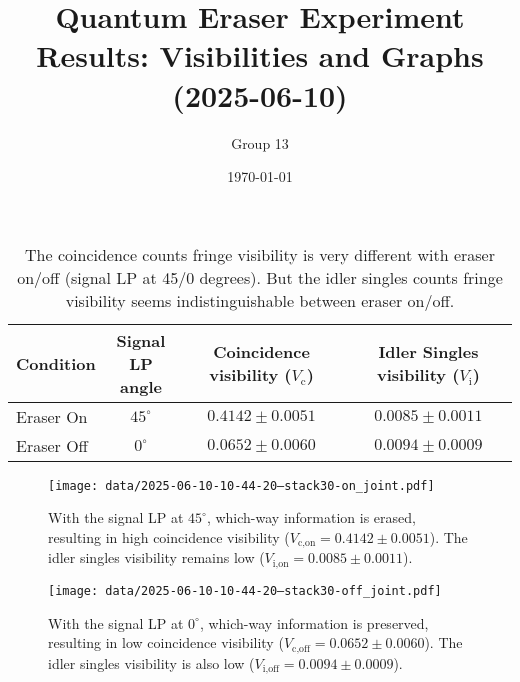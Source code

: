\documentclass{article}
\title{Quantum Eraser Experiment Results: Visibilities and Graphs (2025-06-10)}
\author{Group 13} %
\date{\today}
\begin{document}
\pagestyle{empty} %

\begin{table}[h!]
\centering
\begin{tabular}{lccc}
\toprule
Condition & \makecell{Signal \\ LP angle} & \makecell{Coincidence \\ visibility ($V_{\text{c}}$)} & \makecell{Idler Singles \\ visibility ($V_{\text{i}}$)} \\
\midrule
Eraser On   & $45^\circ$ & $0.4142 \pm 0.0051$ & $0.0085 \pm 0.0011$ \\
Eraser Off  & $0^\circ$  & $0.0652 \pm 0.0060$ & $0.0094 \pm 0.0009$ \\
\bottomrule
\end{tabular}
\caption*{
  The coincidence counts fringe visibility is very different with eraser on/off (signal LP at 45/0 degrees).
  But the idler singles counts fringe visibility seems indistinguishable between eraser on/off.
}
\end{table}

\begin{figure}[h!]
\centering
\texttt{[image: data/2025-06-10-10-44-20--stack30-on\_joint.pdf]}
\caption*{
  With the signal LP at $45^\circ$, which-way information is erased, resulting in high coincidence visibility ($V_{\text{c,on}}=0.4142 \pm 0.0051$). The idler singles visibility remains low ($V_{\text{i,on}}=0.0085 \pm 0.0011$).
}
\end{figure}

\begin{figure}[h!]
\centering
\texttt{[image: data/2025-06-10-10-44-20--stack30-off\_joint.pdf]}
\caption*{
  With the signal LP at $0^\circ$, which-way information is preserved, resulting in low coincidence visibility ($V_{\text{c,off}}=0.0652 \pm 0.0060$). The idler singles visibility is also low ($V_{\text{i,off}}=0.0094 \pm 0.0009$).
}
\end{figure}
\end{document}

